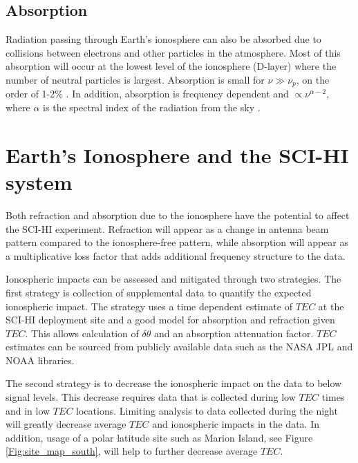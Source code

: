 \subsection{Absorption}

Radiation passing through Earth's ionosphere can also be absorbed due to collisions between electrons and other particles in the atmosphere. Most of this absorption will occur at the lowest level of the ionosphere (D-layer) where the number of neutral particles is largest. Absorption is small for $\nu \gg \nu_p$, on the order of 1-2\% \cite{vedantham_2014}. In addition, absorption is frequency dependent and $\propto \nu^{\alpha -2}$, where $\alpha$ is the spectral index of the radiation from the sky \cite{vedantham_2014}. 



\section{Earth's Ionosphere and the SCI-HI system}

Both refraction and absorption due to the ionosphere have the potential to affect the SCI-HI experiment. Refraction will appear as a change in antenna beam pattern compared to the ionosphere-free pattern, while absorption will appear as a multiplicative loss factor that adds additional frequency structure to the data. 

Ionospheric impacts can be assessed and mitigated through two strategies. The first strategy is collection of supplemental data to quantify the expected ionospheric impact. The strategy uses a time dependent estimate of $TEC$ at the SCI-HI deployment site and a good model for absorption and refraction given $TEC$. This allows calculation of $\delta \theta$ and an absorption attenuation factor. $TEC$ estimates can be sourced from publicly available data such as the NASA JPL and NOAA libraries. 

The second strategy is to decrease the ionospheric impact on the data to below \cm signal levels. This decrease requires data that is collected during low $TEC$ times and in low $TEC$ locations. Limiting analysis to data collected during the night will greatly decrease average $TEC$ and ionospheric impacts in the data. In addition, usage of a polar latitude site such as Marion Island, see Figure \ref{Fig:site_map_south}, will help to further decrease average $TEC$.

